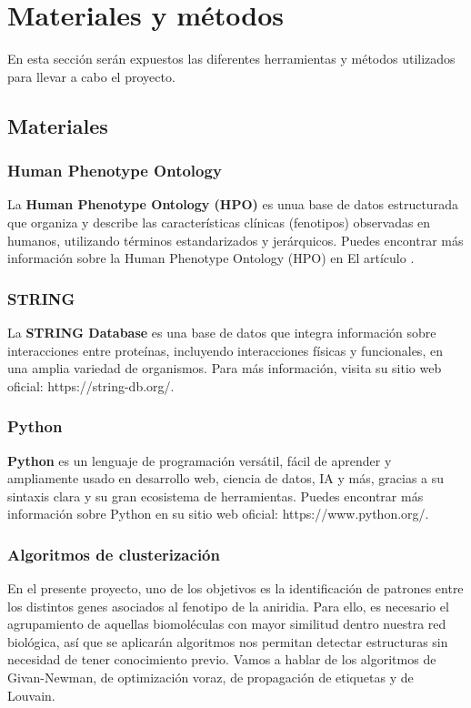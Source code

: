 \section{Materiales y métodos}

En esta sección serán expuestos las diferentes herramientas y métodos utilizados para llevar a cabo el proyecto.

\subsection{\textbf{Materiales}}
\subsubsection{Human Phenotype Ontology}

La \textbf{Human Phenotype Ontology (HPO)} es unua base de datos estructurada que organiza y describe las características clínicas (fenotipos) observadas en humanos, utilizando términos estandarizados y jerárquicos. Puedes encontrar más información sobre la Human Phenotype Ontology (HPO) en El artículo \cite{Gargano2024}.

\subsubsection{STRING}

La \textbf{STRING Database} es una base de datos que integra información sobre interacciones entre proteínas, incluyendo interacciones físicas y funcionales, en una amplia variedad de organismos.  Para más información, visita su sitio web oficial: https://string-db.org/.

\subsubsection{Python}

\textbf{Python} es un lenguaje de programación versátil, fácil de aprender y ampliamente usado en desarrollo web, ciencia de datos, IA y más, gracias a su sintaxis clara y su gran ecosistema de herramientas. Puedes encontrar más información sobre Python en su sitio web oficial: https://www.python.org/.

\subsubsection{Algoritmos de clusterización}
En el presente proyecto, uno de los objetivos es la identificación de patrones entre los distintos genes asociados al fenotipo de la aniridia. Para ello, es necesario el agrupamiento de aquellas biomoléculas con mayor similitud dentro nuestra red biológica, así que se aplicarán algoritmos nos permitan detectar estructuras sin necesidad de tener conocimiento previo. Vamos a hablar de los algoritmos de Givan-Newman, de optimización voraz, de propagación de etiquetas y de Louvain.

